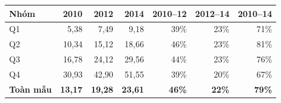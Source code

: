 \begin{tabular}{lrrrrrr}
\toprule
Nhóm & 2010 & 2012 & 2014 & 2010–12 & 2012–14 & 2010–14 \\
\midrule
Q1 & 5,38 & 7,49 & 9,18 & 39\% & 23\% & 71\% \\
Q2 & 10,34 & 15,12 & 18,66 & 46\% & 23\% & 81\% \\
Q3 & 16,78 & 24,12 & 29,56 & 44\% & 23\% & 76\% \\
Q4 & 30,93 & 42,90 & 51,55 & 39\% & 20\% & 67\% \\
\textbf{Toàn mẫu} & \textbf{13,17} & \textbf{19,28} & \textbf{23,61} & \textbf{46\%} & \textbf{22\%} & \textbf{79\%} \\
\bottomrule
\end{tabular}
